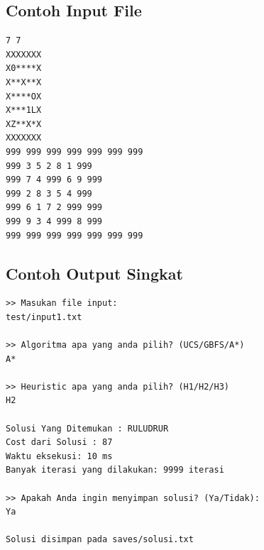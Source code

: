 \subsection{Contoh Input File}

\begin{tcolorbox}[
	colback=gray!5,
	colframe=black!60,
	title=\textbf{Contoh File Input \texttt{.txt}},
	arc=2mm,
	boxrule=0.8pt
]
\small
\begin{verbatim}
7 7
XXXXXXX
X0****X
X**X**X
X****OX
X***1LX
XZ**X*X
XXXXXXX
999 999 999 999 999 999 999
999 3 5 2 8 1 999
999 7 4 999 6 9 999
999 2 8 3 5 4 999
999 6 1 7 2 999 999
999 9 3 4 999 8 999
999 999 999 999 999 999 999
\end{verbatim}
\end{tcolorbox}

\subsection{Contoh Output Singkat}

\begin{tcolorbox}[
	colback=gray!5,
	colframe=black!60,
	title=\textbf{Contoh Output Program},
	arc=2mm,
	boxrule=0.8pt
]
\small
\begin{verbatim}
>> Masukan file input:
test/input1.txt

>> Algoritma apa yang anda pilih? (UCS/GBFS/A*)
A*

>> Heuristic apa yang anda pilih? (H1/H2/H3)
H2

Solusi Yang Ditemukan : RULUDRUR
Cost dari Solusi : 87
Waktu eksekusi: 10 ms
Banyak iterasi yang dilakukan: 9999 iterasi

>> Apakah Anda ingin menyimpan solusi? (Ya/Tidak):
Ya

Solusi disimpan pada saves/solusi.txt
\end{verbatim}
\end{tcolorbox}
